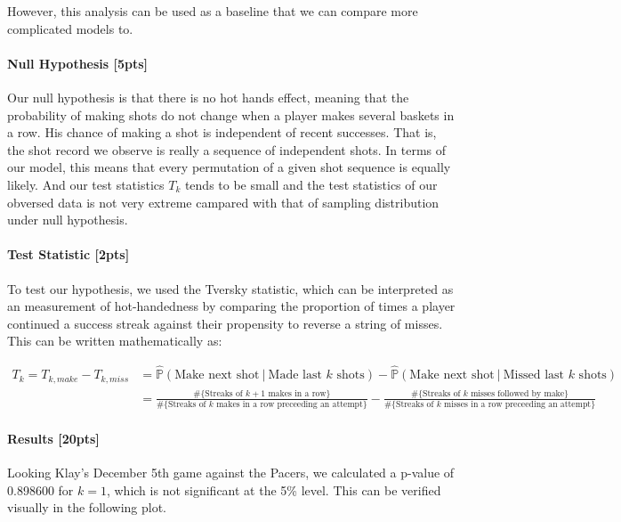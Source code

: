 \documentclass[11pt]{article}
\begin{document}
However, this analysis can be used as a baseline that we can compare
more complicated models to.

    \paragraph{Null Hypothesis {[}5pts{]}}\label{null-hypothesis-5pts}

    Our null hypothesis is that there is no hot hands effect, meaning that
the probability of making shots do not change when a player makes
several baskets in a row. His chance of making a shot is independent of
recent successes. That is, the shot record we observe is really a
sequence of independent shots. In terms of our model, this means that
every permutation of a given shot sequence is equally likely. And our
test statistics \(T_k\) tends to be small and the test statistics of our
obversed data is not very extreme campared with that of sampling
distribution under null hypothesis.

    \paragraph{Test Statistic {[}2pts{]}}\label{test-statistic-2pts}

    To test our hypothesis, we used the Tversky statistic, which can be
interpreted as an measurement of hot-handedness by comparing the
proportion of times a player continued a success streak against their
propensity to reverse a string of misses. This can be written
mathematically as:

\begin{align*}
  T_k = T_{k, make} - T_{k, miss}
  & = \hat{\mathbb{P}}(\text{Make next shot}\ \vert\ \text{Made last $k$ shots})-\hat{\mathbb{P}}(\text{Make next shot}\ \vert\ \text{Missed last $k$ shots})\\
  & = \frac{\#\{\text{Streaks of $k+1$ makes in a row}\}}{\#\{\text{Streaks of $k$ makes in a row preceeding an attempt}\}} - \frac{\#\{\text{Streaks of $k$ misses followed by make}\}}{\#\{\text{Streaks of $k$ misses in a row preceeding an attempt}\}}
\end{align*}

    \paragraph{Results {[}20pts{]}}\label{results-20pts}

    Looking Klay's December 5th game against the Pacers, we calculated a
p-value of 0.898600 for \(k=1\), which is not significant at the 5\%
level. This can be verified visually in the following plot.
\end{document}
